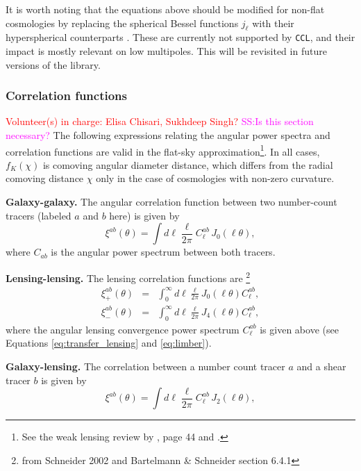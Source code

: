 \documentclass[\docopts]{\docclass}
\newcommand{\vol}[1]{\textcolor{red}{Volunteer(s) in charge: #1}}
\newcommand{\sukhdeep}[1]{\textcolor{magenta}{SS:#1}}
\newcommand{\ccl}{{\tt CCL}\xspace}
\begin{document}
It is worth noting that the equations above should be modified for non-flat cosmologies by replacing the spherical Bessel functions $j_\ell$ with their hyperspherical counterparts \cite{1994ApJ...432....7K}. These are currently not supported by \ccl, and their impact is mostly relevant on low multipoles. This will be revisited in future versions of the library.


\subsubsection{Correlation functions}
\vol{Elisa Chisari, Sukhdeep Singh?}
\sukhdeep{Is this section necessary?}
The following expressions relating the angular power spectra and correlation functions are valid in the flat-sky approximation\footnote{See the weak lensing review by \citet{Bartelmann01}, page 44 and \citet{Joachimi10}.}. In all cases, $f_K(\chi)$ is comoving angular diameter distance, which differs from the radial comoving distance $\chi$ only in the case of cosmologies with non-zero curvature.

{\bf Galaxy-galaxy.} The angular correlation function between two number-count tracers (labeled $a$ and $b$ here) is given by
\begin{equation}
  \xi^{ab}(\theta) = \int d\ell \frac{\ell}{2\pi} C^{ab}_\ell\, J_0(\ell\theta),
\label{eq:xiclu}
\end{equation}
where $C_{ab}$ is the angular power spectrum between both tracers.

{\bf Lensing-lensing.} The lensing correlation functions are \footnote{from Schneider 2002 and Bartelmann \& Schneider section 6.4.1}
\begin{eqnarray}
  \xi^{ab}_{+}(\theta)&=&\int_0^{\infty}d\ell\frac{\ell}{2\pi}J_0(\ell\theta)C^{ab}_\ell,\\
  \xi^{ab}_{-}(\theta)&=&\int_0^{\infty}d\ell\frac{\ell}{2\pi}J_4(\ell\theta)C^{ab}_\ell,
\label{eq:xipxim}
\end{eqnarray}
where the angular lensing convergence power spectrum $C^{ab}_\ell$ is given above (see Equations \ref{eq:transfer_lensing} and \ref{eq:limber}).

{\bf Galaxy-lensing.} The correlation between a number count tracer $a$ and a shear tracer $b$ is given by
\begin{equation}
  \xi^{ab}(\theta) = \int d\ell \frac{\ell}{2\pi} C^{ab}_\ell\, J_2(\ell\theta),
\end{equation}
\end{document}
